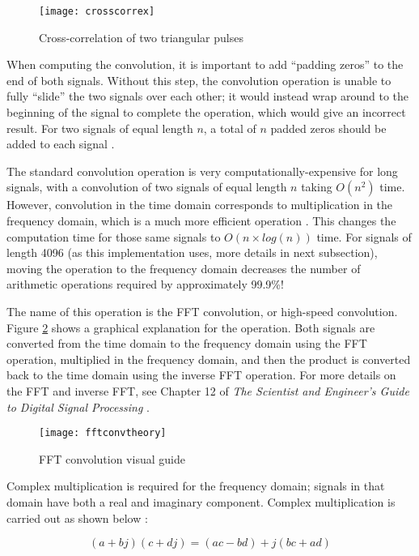 \documentclass[12pt,a4paper]{report}
\begin{document}
\begin{figure}[htbp]
	\centering
	\texttt{[image: crosscorrex]}
	\caption{Cross-correlation of two triangular pulses}
	\label{fig:crosscorrex}
\end{figure}

When computing the convolution, it is important to add “padding zeros” to the end of both signals. Without this step, the convolution operation is unable to fully “slide” the two signals over each other; it would instead wrap around to the beginning of the signal to complete the operation, which would give an incorrect result. For two signals of equal length \(n\), a total of \(n\) padded zeros should be added to each signal \cite{dspguide}.

The standard convolution operation is very computationally-expensive for long signals, with a convolution of two signals of equal length \(n\) taking \(O(n^2)\) time. However, convolution in the time domain corresponds to multiplication in the frequency domain, which is a much more efficient operation \cite{dspguide}. This changes the computation time for those same signals to \(O(n \times log(n))\) time. For signals of length 4096 (as this implementation uses, more details in next subsection), moving the operation to the frequency domain decreases the number of arithmetic operations required by approximately 99.9\%!

The name of this operation is the FFT convolution, or high-speed convolution. Figure \ref{fig:fftconvtheory} shows a graphical explanation for the operation. Both signals are converted from the time domain to the frequency domain using the FFT operation, multiplied in the frequency domain, and then the product is converted back to the time domain using the inverse FFT operation. For more details on the FFT and inverse FFT, see Chapter 12 of \textit{The Scientist and Engineer’s Guide to Digital Signal Processing} \cite{dspguide}. 

\begin{figure}[htbp]
\centering
\texttt{[image: fftconvtheory]}
\caption{FFT convolution visual guide \cite{dspguide}}
\label{fig:fftconvtheory}
\end{figure}

Complex multiplication is required for the frequency domain; signals in that domain have both a real and imaginary component. Complex multiplication is carried out as shown below \cite{dspguide}:

\begin{equation} \label{eq:3eq2}
(a + bj) (c + dj) = (ac - bd) + j(bc + ad)
\end{equation}
\end{document}
